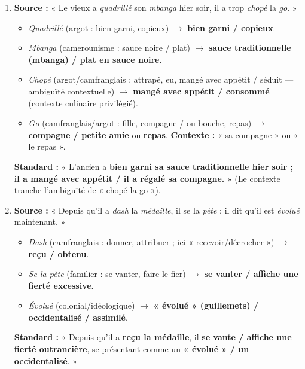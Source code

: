 \documentclass[11pt]{article}
\begin{document}
\begin{corrige}
\begin{enumerate}
    \item \textbf{Source :} « Le vieux a \emph{quadrillé} son \emph{mbanga} hier soir, il a trop \emph{chopé} la \emph{go}. »
    \begin{itemize}
        \item \emph{Quadrillé} (argot : bien garni, copieux) $\to$ \textbf{bien garni / copieux}.
        \item \emph{Mbanga} (camerounisme : sauce noire / plat) $\to$ \textbf{sauce traditionnelle (mbanga) / plat en sauce noire}.
        \item \emph{Chopé} (argot/camfranglais : attrapé, eu, mangé avec appétit / séduit — ambiguïté contextuelle) $\to$ \textbf{mangé avec appétit / consommé} (contexte culinaire privilégié).
        \item \emph{Go} (camfranglais/argot : fille, compagne / ou bouche, repas) $\to$ \textbf{compagne / petite amie} ou \textbf{repas}. \textbf{Contexte :} « sa compagne » ou « le repas ».
    \end{itemize}
    \textbf{Standard :} « L'ancien a \textbf{bien garni sa sauce traditionnelle hier soir ; il a mangé avec appétit / il a régalé sa compagne.} » (Le contexte tranche l'ambiguïté de « chopé la go »).

    \item \textbf{Source :} « Depuis qu'il a \emph{dash} la \emph{médaille}, il se la \emph{pète} : il dit qu'il est \emph{évolué} maintenant. »
    \begin{itemize}
        \item \emph{Dash} (camfranglais : donner, attribuer ; ici « recevoir/décrocher ») $\to$ \textbf{reçu / obtenu}.
        \item \emph{Se la pète} (familier : se vanter, faire le fier) $\to$ \textbf{se vanter / affiche une fierté excessive}.
        \item \emph{Évolué} (colonial/idéologique) $\to$ \textbf{« évolué » (guillemets) / occidentalisé / assimilé}.
    \end{itemize}
    \textbf{Standard :} « Depuis qu'il a \textbf{reçu la médaille}, il \textbf{se vante / affiche une fierté outrancière}, se présentant comme un \textbf{« évolué » / un occidentalisé}. »


\end{enumerate}
\end{corrige}
\end{document}
